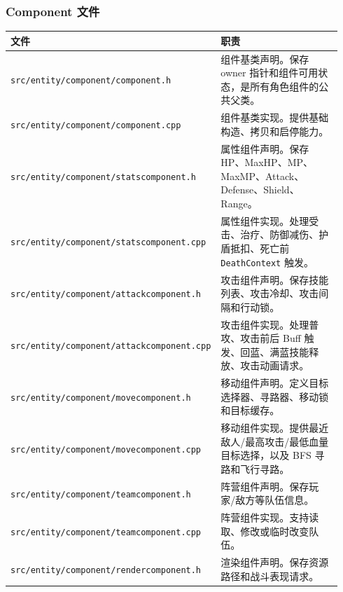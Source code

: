 \documentclass[UTF8,10pt]{ctexart}
\begin{document}
\subsubsection*{Component 文件}

{\small
\begin{longtable}{p{0.34\linewidth}p{0.60\linewidth}}
\toprule
\textbf{文件} & \textbf{职责} \\
\midrule
\texttt{src/\allowbreak{}entity/\allowbreak{}component/\allowbreak{}component.\allowbreak{}h} & 组件基类声明。保存 owner 指针和组件可用状态，是所有角色组件的公共父类。 \\
\texttt{src/\allowbreak{}entity/\allowbreak{}component/\allowbreak{}component.\allowbreak{}cpp} & 组件基类实现。提供基础构造、拷贝和启停能力。 \\
\texttt{src/\allowbreak{}entity/\allowbreak{}component/\allowbreak{}statscomponent.\allowbreak{}h} & 属性组件声明。保存 HP、MaxHP、MP、MaxMP、Attack、Defense、Shield、Range。 \\
\texttt{src/\allowbreak{}entity/\allowbreak{}component/\allowbreak{}statscomponent.\allowbreak{}cpp} & 属性组件实现。处理受击、治疗、防御减伤、护盾抵扣、死亡前 \texttt{DeathContext} 触发。 \\
\texttt{src/\allowbreak{}entity/\allowbreak{}component/\allowbreak{}attackcomponent.\allowbreak{}h} & 攻击组件声明。保存技能列表、攻击冷却、攻击间隔和行动锁。 \\
\texttt{src/\allowbreak{}entity/\allowbreak{}component/\allowbreak{}attackcomponent.\allowbreak{}cpp} & 攻击组件实现。处理普攻、攻击前后 Buff 触发、回蓝、满蓝技能释放、攻击动画请求。 \\
\texttt{src/\allowbreak{}entity/\allowbreak{}component/\allowbreak{}movecomponent.\allowbreak{}h} & 移动组件声明。定义目标选择器、寻路器、移动锁和目标缓存。 \\
\texttt{src/\allowbreak{}entity/\allowbreak{}component/\allowbreak{}movecomponent.\allowbreak{}cpp} & 移动组件实现。提供最近敌人/最高攻击/最低血量目标选择，以及 BFS 寻路和飞行寻路。 \\
\texttt{src/\allowbreak{}entity/\allowbreak{}component/\allowbreak{}teamcomponent.\allowbreak{}h} & 阵营组件声明。保存玩家/敌方等队伍信息。 \\
\texttt{src/\allowbreak{}entity/\allowbreak{}component/\allowbreak{}teamcomponent.\allowbreak{}cpp} & 阵营组件实现。支持读取、修改或临时改变队伍。 \\
\texttt{src/\allowbreak{}entity/\allowbreak{}component/\allowbreak{}rendercomponent.\allowbreak{}h} & 渲染组件声明。保存资源路径和战斗表现请求。 \\

\end{longtable}}
\end{document}
